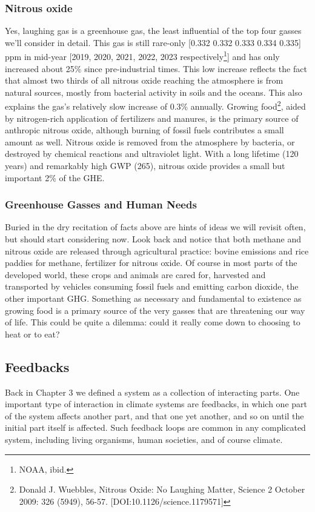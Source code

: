 \subsubsection{Nitrous oxide}
Yes, laughing gas is a greenhouse gas, the least influential of the top four gasses we'll consider in detail. This gas is still rare-only [0.332 0.332 0.333 0.334 0.335] ppm in mid-year [2019, 2020, 2021, 2022, 2023 respectively\footnote{NOAA, ibid.}] and has only increased about 25\% since pre-industrial times. This low increase reflects the fact that almost two thirds of all nitrous oxide reaching the atmosphere is from natural sources, mostly from bacterial activity in soils and the oceans. This also explains the gas's relatively slow increase of 0.3\% annually. Growing food\footnote{Donald J. Wuebbles, Nitrous Oxide: No Laughing Matter, Science 2 October 2009: 326 (5949), 56-57. [DOI:10.1126/science.1179571]}, aided by nitrogen-rich application of fertilizers and manures, is the primary source of anthropic nitrous oxide, although burning of fossil fuels contributes a small amount as well. Nitrous oxide is removed from the atmosphere by bacteria, or destroyed by chemical reactions and ultraviolet light. With a long lifetime (120 years) and remarkably high GWP (265), nitrous oxide provides a small but important 2\% of the GHE.\\
\subsubsection{Greenhouse Gasses and Human Needs}
Buried in the dry recitation of facts above are hints of ideas we will revisit often, but should start considering now. Look back and notice that both methane and nitrous oxide are released through agricultural practice: bovine emissions and rice paddies for methane, fertilizer for nitrous oxide. Of course in most parts of the developed world, these crops and animals are cared for, harvested and transported by vehicles consuming fossil fuels and emitting carbon dioxide, the other important GHG. Something as necessary and fundamental to existence as growing food is a primary source of the very gasses that are threatening our way of life. This could be quite a dilemma: could it really come down to choosing to heat or to eat?\\

\subsection{Feedbacks}
Back in Chapter 3 we defined a system as a collection of interacting parts. One important type of interaction in climate systems are feedbacks, in which one part of the system affects another part, and that one yet another, and so on until the initial part itself is affected. Such feedback loops are common in any complicated system, including living organisms, human societies, and of course climate.\\
